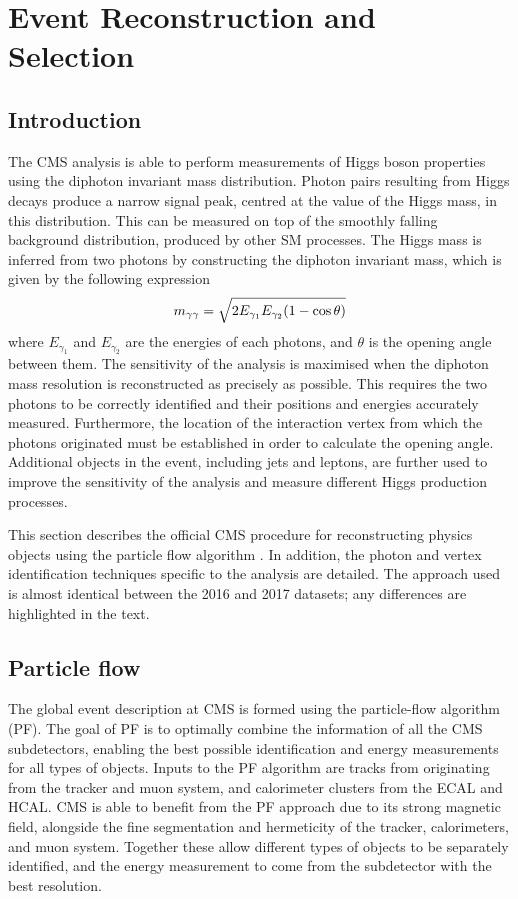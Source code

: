 \chapter{Event Reconstruction and Selection}
\label{chap:objects}

\section{Introduction}

The CMS \Hgg analysis is able to perform measurements of Higgs boson properties using the diphoton invariant mass distribution.
Photon pairs resulting from Higgs decays produce a narrow signal peak, centred at the value of the Higgs mass, in this distribution.
This can be measured on top of the smoothly falling background distribution, produced by other SM processes.
The Higgs mass is inferred from two photons by constructing the diphoton invariant mass, which is given by the following expression
\begin{equation}
m_{\gamma\gamma} = \sqrt{ 2 E_{\gamma_1} E_{\gamma_2} (1 - \cos{\theta}) }
\end{equation}
where $E_{\gamma_1}$ and $E_{\gamma_2}$ are the energies of each photons, and $\theta$ is the opening angle between them.
The sensitivity of the analysis is maximised when the diphoton mass resolution is reconstructed as precisely as possible.
This requires the two photons to be correctly identified and their positions and energies accurately measured.
Furthermore, the location of the interaction vertex from which the photons originated must be established in order to calculate the opening angle.
Additional objects in the event, including jets and leptons, are further used to improve the sensitivity of the analysis and measure different Higgs production processes.

This section describes the official CMS procedure for reconstructing physics objects using the particle flow algorithm \cite{ParticleFlow}.
In addition, the photon and vertex identification techniques specific to the \Hgg analysis are detailed.
The approach used is almost identical between the 2016 and 2017 datasets; 
any differences are highlighted in the text.

\section{Particle flow}
The global event description at CMS is formed using the particle-flow algorithm (PF).
The goal of PF is to optimally combine the information of all the CMS subdetectors, 
enabling the best possible identification and energy measurements for all types of objects.
Inputs to the PF algorithm are tracks from originating from the tracker and muon system, 
and calorimeter clusters from the ECAL and HCAL.
CMS is able to benefit from the PF approach due to its strong magnetic field, 
alongside the fine segmentation and hermeticity of the tracker, calorimeters, and muon system.
Together these allow different types of objects to be separately identified, 
and the energy measurement to come from the subdetector with the best resolution.

